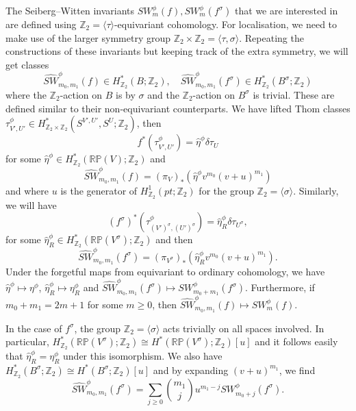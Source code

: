 \documentclass{amsart}
\theoremstyle{definition}
\theoremstyle{remark}
\numberwithin{equation}{section}
\begin{document}
The Seiberg--Witten invariants $SW^\phi_m(f), SW^\phi_m(f^\sigma)$ that we are interested in are defined using $\mathbb{Z}_2 = \langle \tau \rangle$-equivariant cohomology. For localisation, we need to make use of the larger symmetry group $\mathbb{Z}_2 \times \mathbb{Z}_2 = \langle \tau, \sigma \rangle$. Repeating the constructions of these invariants but keeping track of the extra symmetry, we will get classes
\[
\widehat{SW}^\phi_{m_0,m_1}(f) \in H^*_{\mathbb{Z}_2}( B ; \mathbb{Z}_2), \quad \widehat{SW}^\phi_{m_0,m_1}(f^{\sigma}) \in H^*_{\mathbb{Z}_2}( B^\sigma ; \mathbb{Z}_2)
\]
where the $\mathbb{Z}_2$-action on $B$ is by $\sigma$ and the $\mathbb{Z}_2$-action on $B^\sigma$ is trivial. These are defined similar to their non-equivariant counterparts. We have lifted Thom classes $\tau^\phi_{V',U'} \in H^*_{\mathbb{Z}_2 \times \mathbb{Z}_2}( S^{V',U'} , S^{U} ; \mathbb{Z}_2)$, then
\[
f^*( \tau^\phi_{V',U'} ) = \widehat{\eta}^\phi \delta \tau_U
\]
for some $\widehat{\eta}^\phi \in H^*_{\mathbb{Z}_2}( \mathbb{RP}(V) ; \mathbb{Z}_2)$ and
\[
\widehat{SW}^\phi_{m_0,m_1}(f) = (\pi_V)_*( \widehat{\eta}^\phi v^{m_0} (v+u)^{m_1} )
\]
and where $u$ is the generator of $H^1_{\mathbb{Z}_2}(pt ; \mathbb{Z}_2)$ for the group $\mathbb{Z}_2 = \langle \sigma \rangle$. Similarly, we will have
\[
(f^\sigma)^*( \tau^\phi_{(V')^\sigma , (U')^\sigma} ) = \widehat{\eta}^\phi_R \delta \tau_{U^\sigma},
\]
for some $\widehat{\eta}^\phi_R \in H^*_{\mathbb{Z}_2}( \mathbb{RP}(V^\sigma) ; \mathbb{Z}_2)$ and then
\[
\widehat{SW}^\phi_{m_0,m_1}(f^{\sigma}) = (\pi_{V^{\sigma}})_*( \widehat{\eta}^\phi_R v^{m_0} (v+u)^{m_1}).
\]
Under the forgetful maps from equivariant to ordinary cohomology, we have $\widehat{\eta}^\phi \mapsto \eta^\phi$, $\widehat{\eta}^\phi_R \mapsto \eta^\phi_R$ and $\widehat{SW}^\phi_{m_0,m_1}(f^\sigma) \mapsto SW^\phi_{m_0+m_1}(f^\sigma)$. Furthermore, if $m_0 + m_1 = 2m+1$ for some $m \ge 0$, then $\widehat{SW}^\phi_{m_0,m_1}(f) \mapsto SW^\phi_{m}(f)$.

In the case of $f^\sigma$, the group $\mathbb{Z}_2 = \langle \sigma \rangle$ acts trivially on all spaces involved. In particular, $H^*_{\mathbb{Z}_2}( \mathbb{RP}(V^\sigma) ; \mathbb{Z}_2) \cong H^*(\mathbb{RP}(V^\sigma) ; \mathbb{Z}_2)[u]$ and it follows easily that $\widehat{\eta}^\phi_R = \eta^\phi_R$ under this isomorphism. We also have $H^*_{\mathbb{Z}_2}( B^\sigma ; \mathbb{Z}_2) \cong H^*( B^\sigma ; \mathbb{Z}_2)[u]$ and by expanding $(v+u)^{m_1}$, we find
\[
\widehat{SW}^\phi_{m_0,m_1}(f^\sigma) = \sum_{j \ge 0} \binom{m_1}{j} u^{m_1-j} SW^\phi_{m_0+j}(f^\sigma).
\]
\end{document}
